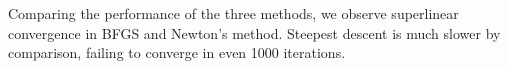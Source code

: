 \documentclass{../kin_math}
\begin{document}
\begin{questions}
\begin{enumerate}
\begin{solution}
      Comparing the performance of the three methods, we observe superlinear convergence in BFGS and Newton's method. Steepest descent is much slower by comparison, failing to converge in even 1000 iterations.
    \end{solution}
  \end{enumerate}
\end{questions}
\end{document}
